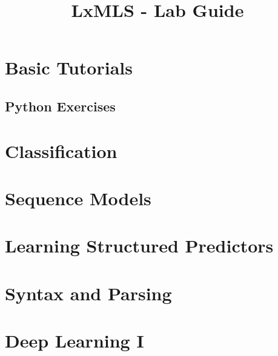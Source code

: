 \documentclass{report}
\begin{document}
\title{LxMLS - Lab Guide}

\maketitle

\renewcommand{\chaptername}{Day}
\setcounter{chapter}{-1}

\chapter{Basic Tutorials}


%

\section{Python Exercises}


\chapter{\label{day:classification}Classification}



\chapter{\label{day:seq}Sequence Models}


\chapter{\label{day:seq_disc}Learning Structured Predictors}


\chapter{Syntax and Parsing}


\chapter{Deep Learning I}

\end{document}
